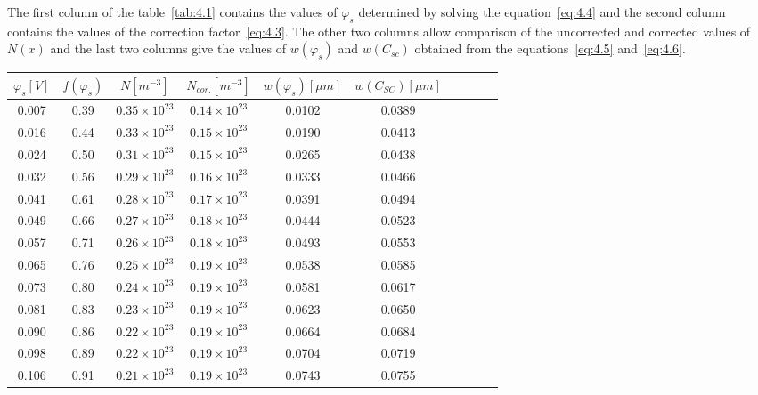 The first column of the table~\ref{tab:4.1} contains the values of
$\varphi_{s}$ determined by solving the equation~\ref{eq:4.4} and the
second column contains the values of the correction
factor~\ref{eq:4.3}. The other two columns allow comparison of the
uncorrected and corrected values of $N(x)$ and the last two columns
give the values of $w(\varphi_{s})$ and $w(C_{sc})$ obtained from the
equations~\ref{eq:4.5} and~\ref{eq:4.6}.

\begin{table}[h!]\centering
  \begin{minipage}[c]{\myfiguresize}
    \begin{center}
      \begin{tabular}{c c c c c c c c c c}
        $\varphi_{s}[V]$ & $f(\varphi_{s})$ & $N[m^{-3}]$ & $N_{cor.}[m^{-3}]$ & $w(\varphi_{s})[\mu m]$ & $w(C_{SC})[\mu m]$ \\
        \hline%
        0.007 & 0.39 & $0.35\times10^{23}$ & $0.14\times10^{23}$ & 0.0102 & 0.0389 \\
        0.016 & 0.44 & $0.33\times10^{23}$ & $0.15\times10^{23}$ & 0.0190 & 0.0413 \\
        0.024 & 0.50 & $0.31\times10^{23}$ & $0.15\times10^{23}$ & 0.0265 & 0.0438 \\
        0.032 & 0.56 & $0.29\times10^{23}$ & $0.16\times10^{23}$ & 0.0333 & 0.0466 \\
        0.041 & 0.61 & $0.28\times10^{23}$ & $0.17\times10^{23}$ & 0.0391 & 0.0494 \\
        0.049 & 0.66 & $0.27\times10^{23}$ & $0.18\times10^{23}$ & 0.0444 & 0.0523 \\
        0.057 & 0.71 & $0.26\times10^{23}$ & $0.18\times10^{23}$ & 0.0493 & 0.0553 \\
        0.065 & 0.76 & $0.25\times10^{23}$ & $0.19\times10^{23}$ & 0.0538 & 0.0585 \\
        0.073 & 0.80 & $0.24\times10^{23}$ & $0.19\times10^{23}$ & 0.0581 & 0.0617 \\
        0.081 & 0.83 & $0.23\times10^{23}$ & $0.19\times10^{23}$ & 0.0623 & 0.0650 \\
        0.090 & 0.86 & $0.22\times10^{23}$ & $0.19\times10^{23}$ & 0.0664 & 0.0684 \\
        0.098 & 0.89 & $0.22\times10^{23}$ & $0.19\times10^{23}$ & 0.0704 & 0.0719 \\
        0.106 & 0.91 & $0.21\times10^{23}$ & $0.19\times10^{23}$ & 0.0743 & 0.0755 \\

\end{tabular}
\end{center}
\end{minipage}
\end{table}
